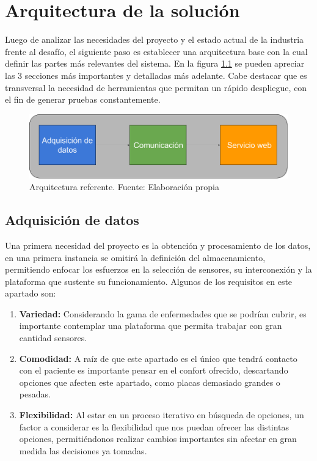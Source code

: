 \chapter{Arquitectura de la solución}\label{arquitectura}

Luego de analizar las necesidades del proyecto y el estado actual de la industria frente al desafío, el siguiente paso es establecer una arquitectura base con la cual definir las partes más relevantes del sistema. En la figura \ref{arqui} se pueden apreciar las 3 secciones más importantes y detalladas más adelante. Cabe destacar que es transversal la necesidad de herramientas que permitan un rápido despliegue, con el fin de generar pruebas constantemente.

\begin{figure}[H]
	\centering
	\includegraphics[scale=0.43]{figuras/arquitectura/arqui.png}
	\caption{Arquitectura referente. Fuente: Elaboración propia}
	\label{arqui}
\end{figure}

\newpage
\section{Adquisición de datos}
Una primera necesidad del proyecto es la obtención y procesamiento de los datos, en una primera instancia se omitirá la definición del almacenamiento, permitiendo enfocar los esfuerzos en la selección de sensores, su interconexión y la plataforma que sustente su funcionamiento. Algunos de los requisitos en este apartado son:

\begin{enumerate}
	\item \textbf{Variedad:}
	Considerando la gama de enfermedades que se podrían cubrir, es importante contemplar una plataforma que permita trabajar con gran cantidad sensores.
	\item \textbf{Comodidad:}
	A raíz de que este apartado es el único que tendrá contacto con el paciente es importante pensar en el confort ofrecido, descartando opciones que afecten este apartado, como placas demasiado grandes o pesadas.
	\item \textbf{Flexibilidad:}
	Al estar en un proceso iterativo en búsqueda de opciones, un factor a considerar es la flexibilidad que nos puedan ofrecer las distintas opciones, permitiéndonos realizar cambios importantes sin afectar en gran medida las decisiones ya tomadas.
\end{enumerate}

